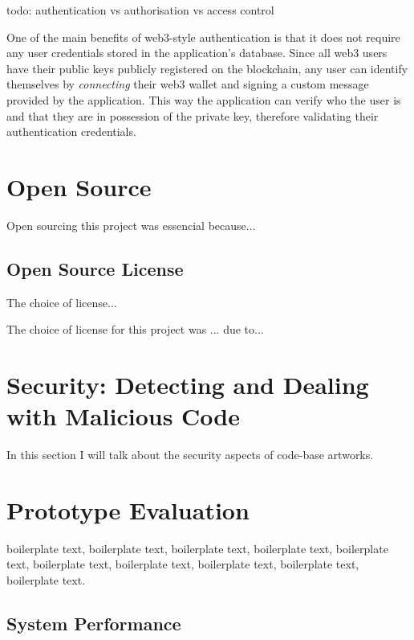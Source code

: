 todo: authentication vs authorisation vs access control

One of the main benefits of web3-style authentication is that it does not require any user credentials stored in the application's database. Since all web3 users have their public keys publicly registered on the blockchain, any user can identify themselves by \emph{connecting} their web3 wallet and signing a custom message provided by the application. This way the application can verify who the user is and that they are in possession of the private key, therefore validating their authentication credentials.

\section{Open Source}

Open sourcing this project was essencial because...

\subsection{Open Source License}

The choice of license...


The choice of license for this project was ... due to...



\section{Security: Detecting and Dealing with Malicious Code}

In this section I will talk about the security aspects of code-base artworks.









\section{Prototype Evaluation}


boilerplate text, boilerplate text, boilerplate text, boilerplate text, boilerplate text, boilerplate text, boilerplate text, boilerplate text, boilerplate text, boilerplate text.

\subsection{System Performance}

